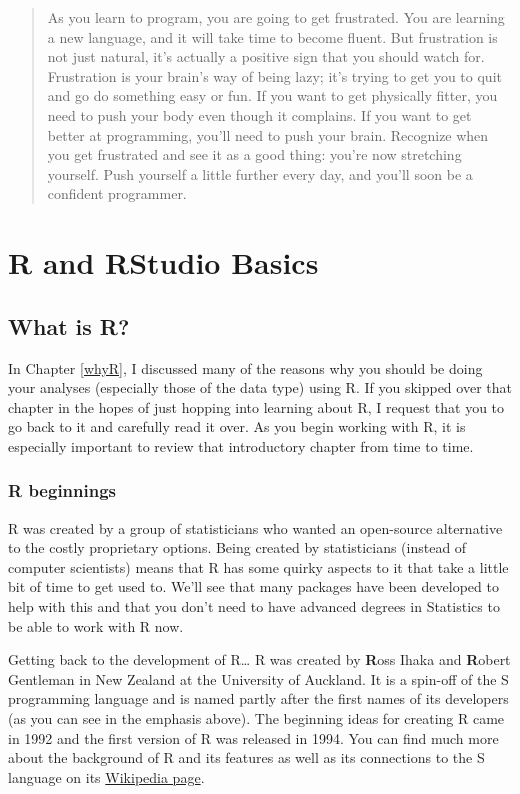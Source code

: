 \documentclass[]{tufte-book}
\theoremstyle{definition}
\theoremstyle{definition}
\theoremstyle{remark}
\begin{document}
\begin{enumerate}
  \begin{quote}
  As you learn to program, you are going to get frustrated. You are
  learning a new language, and it will take time to become fluent. But
  frustration is not just natural, it's actually a positive sign that
  you should watch for. Frustration is your brain's way of being lazy;
  it's trying to get you to quit and go do something easy or fun. If you
  want to get physically fitter, you need to push your body even though
  it complains. If you want to get better at programming, you'll need to
  push your brain. Recognize when you get frustrated and see it as a
  good thing: you're now stretching yourself. Push yourself a little
  further every day, and you'll soon be a confident programmer.
  \end{quote}
\end{enumerate}

\chapter{R and RStudio Basics}\label{rstudiobasics}

\section{What is R?}\label{what-is-r}

In Chapter \ref{whyR}, I discussed many of the reasons why you should be
doing your analyses (especially those of the data type) using R. If you
skipped over that chapter in the hopes of just hopping into learning
about R, I request that you to go back to it and carefully read it over.
As you begin working with R, it is especially important to review that
introductory chapter from time to time.

\subsection{R beginnings}\label{r-beginnings}

R was created by a group of statisticians who wanted an open-source
alternative to the costly proprietary options. Being created by
statisticians (instead of computer scientists) means that R has some
quirky aspects to it that take a little bit of time to get used to.
We'll see that many packages have been developed to help with this and
that you don't need to have advanced degrees in Statistics to be able to
work with R now.

Getting back to the development of R\ldots{} R was created by
\textbf{R}oss Ihaka and \textbf{R}obert Gentleman in New Zealand at the
University of Auckland. It is a spin-off of the S programming language
and is named partly after the first names of its developers (as you can
see in the emphasis above). The beginning ideas for creating R came in
1992 and the first version of R was released in 1994. You can find much
more about the background of R and its features as well as its
connections to the S language on its
\href{https://en.wikipedia.org/wiki/R_(programming_language)}{Wikipedia
page}.
\end{document}
